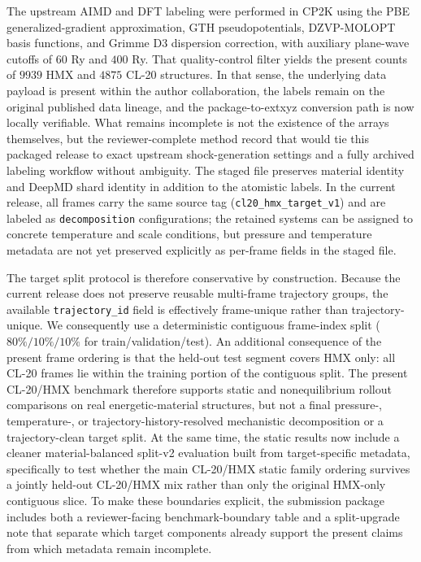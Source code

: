 The upstream AIMD and DFT labeling were performed in CP2K using the PBE generalized-gradient approximation, GTH pseudopotentials, DZVP-MOLOPT basis functions, and Grimme D3 dispersion correction, with auxiliary plane-wave cutoffs of $60$ Ry and $400$ Ry. That quality-control filter yields the present counts of $9939$ HMX and $4875$ CL-20 structures. In that sense, the underlying data payload is present within the author collaboration, the labels remain on the original published data lineage, and the package-to-extxyz conversion path is now locally verifiable. What remains incomplete is not the existence of the arrays themselves, but the reviewer-complete method record that would tie this packaged release to exact upstream shock-generation settings and a fully archived labeling workflow without ambiguity. The staged file preserves material identity and DeepMD shard identity in addition to the atomistic labels. In the current release, all frames carry the same source tag (\texttt{cl20\_hmx\_target\_v1}) and are labeled as \texttt{decomposition} configurations; the retained systems can be assigned to concrete temperature and scale conditions, but pressure and temperature metadata are not yet preserved explicitly as per-frame fields in the staged file.

The target split protocol is therefore conservative by construction. Because the current release does not preserve reusable multi-frame trajectory groups, the available \texttt{trajectory\_id} field is effectively frame-unique rather than trajectory-unique. We consequently use a deterministic contiguous frame-index split ($80\%/10\%/10\%$ for train/validation/test). An additional consequence of the present frame ordering is that the held-out test segment covers HMX only: all CL-20 frames lie within the training portion of the contiguous split. The present CL-20/HMX benchmark therefore supports static and nonequilibrium rollout comparisons on real energetic-material structures, but not a final pressure-, temperature-, or trajectory-history-resolved mechanistic decomposition or a trajectory-clean target split. At the same time, the static results now include a cleaner material-balanced split-v2 evaluation built from target-specific metadata, specifically to test whether the main CL-20/HMX static family ordering survives a jointly held-out CL-20/HMX mix rather than only the original HMX-only contiguous slice. To make these boundaries explicit, the submission package includes both a reviewer-facing benchmark-boundary table and a split-upgrade note that separate which target components already support the present claims from which metadata remain incomplete.


